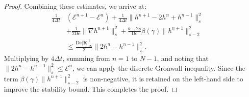 \documentclass[10pt,a4paper]{amsart}
\begin{document}
\begin{proof}
Combining these estimates, we arrive at:
\begin{equation}
\begin{aligned}
    \frac{1}{4\Delta t} &(\mathcal{E}^{n+1} - \mathcal{E}^n) + \frac{1}{4\Delta t}\|h^{n+1}-2h^n+h^{n-1}\|_s^2 \\
    &+ \frac{1}{2\text{De}}\|\nabla h^{n+1}\|_s^2 +  \frac{b-2s}{\text{De}}\beta(\gamma)\|h^{n+1}\|_{s-2}^2 \\
    &\le \frac{\text{De}|\boldsymbol{K}|_\infty^2}{2} \|2h^n - h^{n-1}\|_s^2.
\end{aligned}
\end{equation}
Multiplying by $4\Delta t$, summing from $n=1$ to $N-1$, and noting that $\|2h^n - h^{n-1}\|_s^2 \le \mathcal{E}^n$, we can apply the discrete Gronwall inequality. Since the term $\beta(\gamma)\|h^{n+1}\|_{s-2}^2$ is non-negative, it is retained on the left-hand side to improve the stability bound. This completes the proof.
\end{proof}
\end{document}
